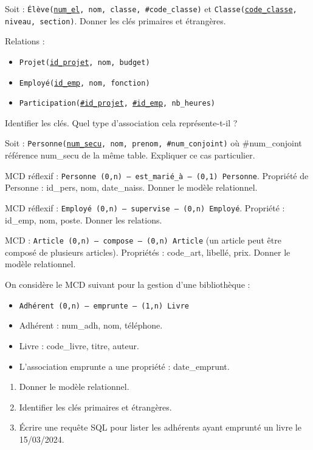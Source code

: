\exo{}
Soit : \texttt{Élève(\underline{num\_el}, nom, classe, \#code\_classe)} et \texttt{Classe(\underline{code\_classe}, niveau, section)}. Donner les clés primaires et étrangères.

\exo{}
Relations :
\begin{itemize}
    \item \texttt{Projet(\underline{id\_projet}, nom, budget)}
    \item \texttt{Employé(\underline{id\_emp}, nom, fonction)}
    \item \texttt{Participation(\underline{\#id\_projet}, \underline{\#id\_emp}, nb\_heures)}
\end{itemize}
Identifier les clés. Quel type d'association cela représente-t-il ?

\exo{}
Soit : \texttt{Personne(\underline{num\_secu}, nom, prenom, \#num\_conjoint)} où \#num\_conjoint référence num\_secu de la même table. Expliquer ce cas particulier.


\exo{}
MCD réflexif : \texttt{Personne (0,n) --- est\_marié\_à --- (0,1) Personne}. Propriété de Personne : id\_pers, nom, date\_naiss. Donner le modèle relationnel.

\exo{}
MCD réflexif : \texttt{Employé (0,n) --- supervise --- (0,n) Employé}. Propriété : id\_emp, nom, poste. Donner les relations.

\exo{}
MCD : \texttt{Article (0,n) --- compose --- (0,n) Article} (un article peut être composé de plusieurs articles). Propriétés : code\_art, libellé, prix. Donner le modèle relationnel.


\exo{}
On considère le MCD suivant pour la gestion d'une bibliothèque :
\begin{itemize}
    \item \texttt{Adhérent (0,n) --- emprunte --- (1,n) Livre}
    \item Adhérent : num\_adh, nom, téléphone.
    \item Livre : code\_livre, titre, auteur.
    \item L'association emprunte a une propriété : date\_emprunt.
\end{itemize}
\begin{enumerate}
    \item Donner le modèle relationnel.
    \item Identifier les clés primaires et étrangères.
    \item Écrire une requête SQL pour lister les adhérents ayant emprunté un livre le 15/03/2024.
\end{enumerate}

